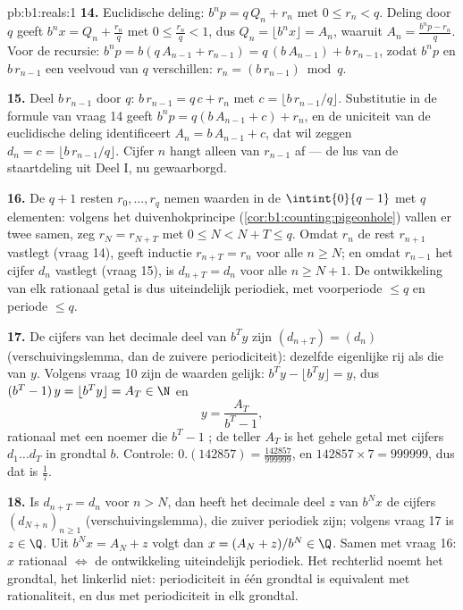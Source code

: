 \begin{solution}{pb:b1:reals:1}
\textbf{14.} Euclidische deling: $b^n p = q\,Q_n + r_n$ met $0 \leq r_n <
q$. Deling door $q$ geeft $b^n x = Q_n + \frac{r_n}{q}$ met $0 \leq
\frac{r_n}{q} < 1$, dus $Q_n = \lfloor b^n x \rfloor = A_n$, waaruit $A_n
= \frac{b^n p - r_n}{q}$. Voor de recursie: $b^n p = b(q\,A_{n-1} +
r_{n-1}) = q\,(b\,A_{n-1}) + b\,r_{n-1}$, zodat $b^n p$ en $b\,r_{n-1}$
een veelvoud van $q$ verschillen: $r_n = (b\,r_{n-1}) \bmod q$.

\textbf{15.} Deel $b\,r_{n-1}$ door $q$: $b\,r_{n-1} = q\,c + r_n$ met $c
= \lfloor b\,r_{n-1}/q \rfloor$. Substitutie in de formule van vraag 14
geeft $b^n p = q(b\,A_{n-1} + c) + r_n$, en de uniciteit van de
euclidische deling identificeert $A_n = b\,A_{n-1} + c$, dat wil zeggen
$d_n = c = \lfloor b\,r_{n-1}/q \rfloor$. Cijfer $n$ hangt alleen van
$r_{n-1}$ af --- de lus van de staartdeling uit Deel I, nu gewaarborgd.

\textbf{16.} De $q + 1$ resten $r_0, \dots, r_q$ nemen waarden in de
 $\intint{0}{q-1}$ met $q$ elementen: volgens het
duivenhokprincipe (\cref{cor:b1:counting:pigeonhole}) vallen er twee
samen, zeg $r_N = r_{N+T}$ met $0 \leq N < N + T \leq q$. Omdat $r_n$ de
rest $r_{n+1}$ vastlegt (vraag 14), geeft inductie $r_{n+T} = r_n$ voor
alle $n \geq N$; en omdat $r_{n-1}$ het cijfer $d_n$ vastlegt (vraag 15),
is $d_{n+T} = d_n$ voor alle $n \geq N + 1$. De ontwikkeling van elk
rationaal getal is dus uiteindelijk periodiek, met voorperiode $\leq q$
en periode $\leq q$.

\textbf{17.} De cijfers van het decimale deel van $b^T y$ zijn
$(d_{n+T}) = (d_n)$ (verschuivingslemma, dan de zuivere periodiciteit):
dezelfde eigenlijke rij als die van $y$. Volgens vraag 10 zijn de waarden
gelijk: $b^T y - \lfloor b^T y \rfloor = y$, dus $(b^T - 1)\,y = \lfloor
b^T y \rfloor = A_T \in \N$ en
\[
y = \frac{A_T}{b^T - 1} ,
\]
rationaal met een noemer die $b^T - 1$ ; de teller $A_T$ is het
gehele getal met cijfers $d_1 \dots d_T$ in grondtal $b$. Controle:
$0.(142857) = \frac{142857}{999999}$, en $142857 \times 7 = 999999$, dus
dat is $\frac 17$.

\textbf{18.} Is $d_{n+T} = d_n$ voor $n > N$, dan heeft het decimale deel
$z$ van $b^N x$ de cijfers $(d_{N+n})_{n\geq1}$ (verschuivingslemma), die
zuiver periodiek zijn; volgens vraag 17 is $z \in \Q$. Uit $b^N x = A_N +
z$ volgt dan $x = (A_N + z)/b^N \in \Q$. Samen met vraag 16: $x$
rationaal $\iff$ de ontwikkeling uiteindelijk periodiek. Het rechterlid
noemt het grondtal, het linkerlid niet: periodiciteit in één grondtal is
equivalent met rationaliteit, en dus met periodiciteit in elk grondtal.


\end{solution}
